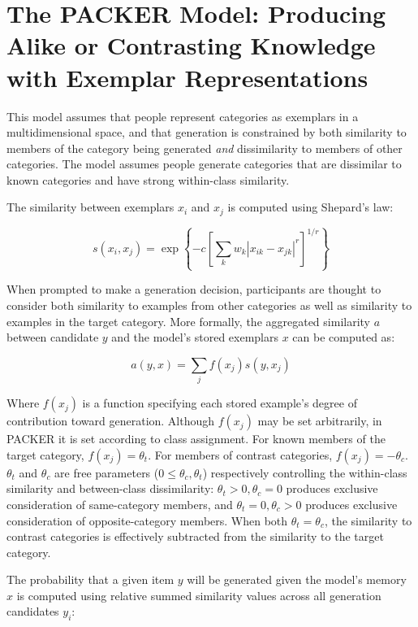 \documentclass[12pt]{article} \usepackage[letterpaper, margin=1in,
\begin{document}
\section{The PACKER Model: Producing Alike or Contrasting Knowledge with
Exemplar Representations}

This model assumes that people represent categories as exemplars in a
multidimensional space, and that generation is constrained by both similarity to
members of the category being generated \textit{and} dissimilarity to members of
other categories. The model assumes people generate categories that are
dissimilar to known categories and have strong within-class similarity.

The similarity between exemplars $x_i$ and $x_j$ is computed using Shepard's
law:

\begin{equation} s\left(x_i,x_j\right) = \exp \left\{ -c \left[\sum_{k}{ w_k
\left| x_{ik} - x_{jk} \right|^r }\right]^{1/r} \right\}
\label{eq:similarity}
\end{equation}

When prompted to make a generation decision, participants are thought to
consider both similarity to examples from other categories as well as similarity
to examples in the target category. More formally, the aggregated similarity $a$
between candidate $y$ and the model's stored exemplars $x$ can be computed as:

\begin{equation} a(y, x) = \sum_j{f(x_j) s(y, x_j)}
\end{equation}

Where $f(x_j)$ is a function specifying each stored example's degree of
contribution toward generation. Although $f(x_j)$ may be set arbitrarily, in
PACKER it is set according to class assignment. For known members of the target
category, $f(x_j) = \theta_t$. For members of contrast categories, $f(x_j) =
-\theta_c$. $\theta_t$ and $\theta_c$ are free parameters ($0 \leq \theta_c, \theta_t$)
respectively controlling the within-class similarity and between-class
dissimilarity: $\theta_t > 0, \theta_c = 0$ produces exclusive consideration of same-category
members, and $\theta_t = 0, \theta_c > 0$ produces exclusive consideration of opposite-category
members. When both $\theta_t = \theta_c$, the similarity to contrast categories is
effectively subtracted from the similarity to the target category.

The probability that a given item $y$ will be generated given the model's memory
$x$ is computed using relative summed similarity values across all generation
candidates $y_i$:
\end{document}
